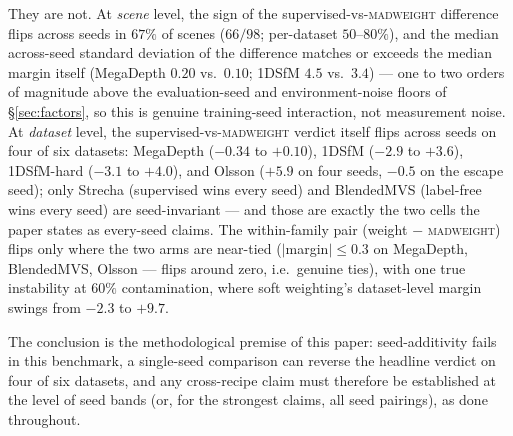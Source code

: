 \documentclass[10pt,twocolumn,letterpaper]{article}
\newcommand{\mad}{\textsc{madweight}}
\begin{document}
They are not. At \emph{scene} level, the sign of the supervised-vs-\mad{} difference
flips across seeds in $67\%$ of scenes ($66/98$; per-dataset $50$--$80\%$), and the
median across-seed standard deviation of the difference matches or exceeds the median
margin itself (MegaDepth $0.20$ vs.\ $0.10$; 1DSfM $4.5$ vs.\ $3.4$) --- one to two
orders of magnitude above the evaluation-seed and environment-noise floors of
\S\ref{sec:factors}, so this is genuine training-seed interaction, not measurement
noise. At \emph{dataset} level, the supervised-vs-\mad{} verdict itself flips across
seeds on four of six datasets: MegaDepth ($-0.34$ to $+0.10$), 1DSfM ($-2.9$ to
$+3.6$), 1DSfM-hard ($-3.1$ to $+4.0$), and Olsson ($+5.9$ on four seeds, $-0.5$ on
the escape seed); only Strecha (supervised wins every seed) and BlendedMVS (label-free
wins every seed) are seed-invariant --- and those are exactly the two cells the paper
states as every-seed claims. The within-family pair (weight $-$ \mad{}) flips only
where the two arms are near-tied ($|$margin$| \le 0.3$ on MegaDepth, BlendedMVS,
Olsson --- flips around zero, i.e.\ genuine ties), with one true instability at
$60\%$ contamination, where soft weighting's dataset-level margin swings from $-2.3$
to $+9.7$.

The conclusion is the methodological premise of this paper: seed-additivity fails in
this benchmark, a single-seed comparison can reverse the headline verdict on four of
six datasets, and any cross-recipe claim must therefore be established at the level of
seed bands (or, for the strongest claims, all seed pairings), as done throughout.
\end{document}
